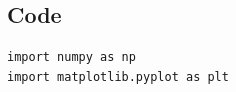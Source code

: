 \documentclass[12pt]{article}
\begin{document}
\subsection*{Code}

%

\begin{minipage}{\linewidth}
\captionsetup{hypcap=false}

\begin{mintedbox}
\begin{verbatim}
import numpy as np
import matplotlib.pyplot as plt


\end{verbatim}
\end{mintedbox}

\end{minipage}
\end{document}
